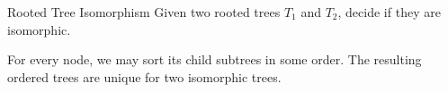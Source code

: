 \documentclass{beamer}
\begin{document}
\begin{frame}{Rooted Tree Isomorphism}
	Given two rooted trees $T_1$ and $T_2$, decide if they are isomorphic.
	
	\pause
	\begin{solution}
		For every node, we may sort its child subtrees in some order. The resulting ordered trees are unique for two isomorphic trees.
	\end{solution}
    \pause
    
    \begin{figure}
    	\centering
    
\end{figure}
\end{frame}
\end{document}
